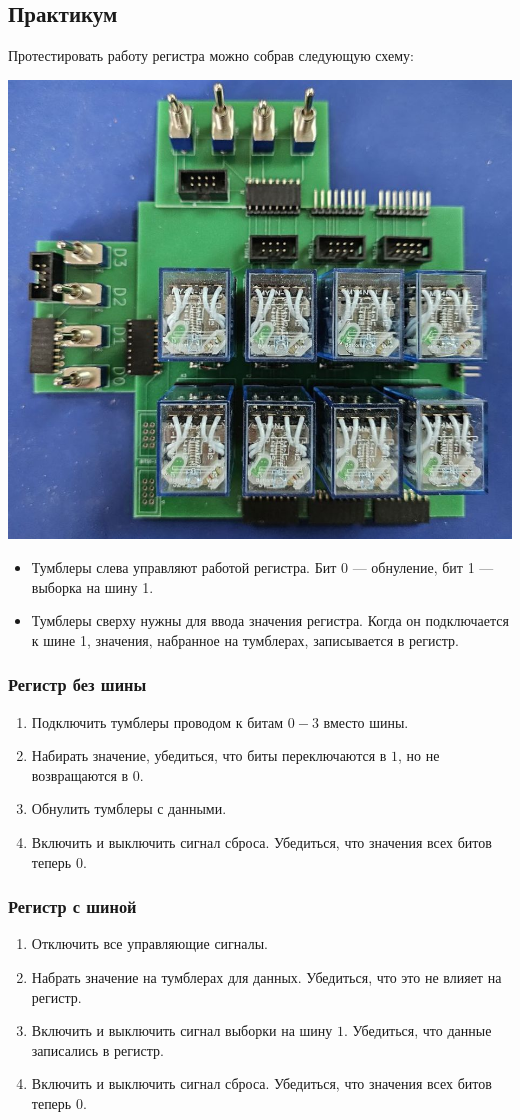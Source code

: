 \subsection{Практикум}

Протестировать работу регистра можно собрав следующую схему:

\includegraphics[width=0.5\columnwidth]{photo/register.jpg}

\begin{itemize}
  \item Тумблеры слева управляют работой регистра. Бит 0 --- обнуление, бит 1 --- выборка на шину 1.
  \item Тумблеры сверху нужны для ввода значения регистра. Когда он подключается к шине 1,
        значения, набранное на тумблерах, записывается в регистр.
\end{itemize}

\subsubsection{Регистр без шины}

\begin{enumerate}
    \item Подключить тумблеры проводом к битам $0-3$ вместо шины.
    \item Набирать значение, убедиться, что биты переключаются в $1$, но не возвращаются в $0$.
    \item Обнулить тумблеры с данными.
    \item Включить и выключить сигнал сброса. Убедиться, что значения всех битов теперь $0$.
\end{enumerate}

\subsubsection{Регистр с шиной}

\begin{enumerate}
    \item Отключить все управляющие сигналы.
    \item Набрать значение на тумблерах для данных. Убедиться, что это не влияет на регистр.
    \item Включить и выключить сигнал выборки на шину $1$. Убедиться, что данные записались в регистр.
    \item Включить и выключить сигнал сброса. Убедиться, что значения всех битов теперь $0$.
\end{enumerate}

